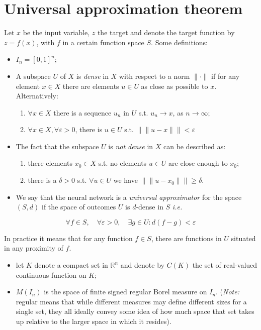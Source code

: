 \section{Universal approximation theorem}
Let $x$ be the input variable, $z$ the target and denote the target function by $z=f(x)$, with $f$ in a certain function space $S$.
Some definitions:

\begin{itemize}
  \item $I_n=[0,1]^n$;
  \item A subspace $U$ of $X$ is \textit{dense} in $X$ with respect to a norm $\|\cdot\|$ if for any element $x\in X$ there are elements $u\in U$ as close as possible to $x$. Alternatively:
  \begin{enumerate}
    \item $\forall x\in X$ there is a sequence $u_n$ in $U$ s.t. $u_n \rightarrow x$, as $n\rightarrow \infty$;
    \item $\forall x \in X,  \forall \varepsilon >0$, there is $u\in U$ s.t.
$\|\|u-x \|\| < \varepsilon$
  \end{enumerate}
  \item The fact that the subspace $U$ is \textit{not dense} in $X$ can be described as:
  \begin{enumerate}
    \item there elements $x_0\in X$ s.t. no elements $u\in U$ are close enough to $x_0$;
    \item there is a $\delta >0$ s.t. $\forall u\in U$ we have $\|\|u-x_0\|\|\geq \delta$.
  \end{enumerate}
  \item We say that the neural network is a \textit{universal approximator} for the space $(S,d)$ if the space of outcomes $U$ is $d$-dense in $S$ \textit{i.e.}
\end{itemize}

$$
\forall f \in S, \quad \forall \varepsilon >0, \quad \exists g\in U : d(f-g)<\varepsilon
$$

In practice it means that for any function $f\in S$, there are functions in $U$ situated in any proximity of $f$.

\begin{itemize}
  \item let $K$ denote a compact set in $\mathbb{R}^n$ and denote by $C(K)$ the set of real-valued continuous function on $K$;
  \item $M(I_n)$ is the space of finite signed regular Borel measure on $I_n$. (\textit{Note:} regular means that while different measures may define different sizes for a single set, they all ideally convey some idea of how much space that set takes up relative to the larger space in which it resides).
\end{itemize}

